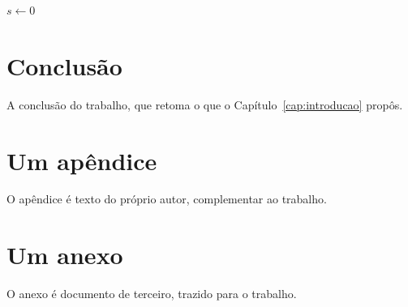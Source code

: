 \documentclass[dsc]{ufrj}
\begin{document}
  \begin{algorithm}[htbp]
    \caption{Um algoritmo de exemplo}
    $s \leftarrow 0$\;
    \;
  \end{algorithm}

  \chapter{Conclusão}
  \label{cap:conclusao}
  A conclusão do trabalho, que retoma o que o Capítulo~\ref{cap:introducao}
  propôs.

  \appendix
  \chapter{Um apêndice}
  O apêndice é texto do próprio autor, complementar ao trabalho.

  \annex
  \chapter{Um anexo}
  O anexo é documento de terceiro, trazido para o trabalho.

  \backmatter
  \printbibliography
  \printglossarylist
  \printindex
\end{document}
